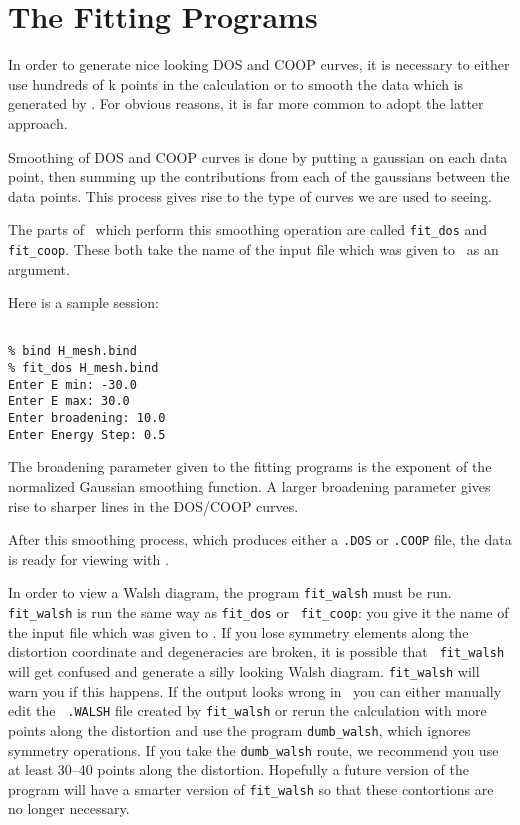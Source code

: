 \chapter{The Fitting Programs}

In order to generate nice looking DOS and COOP curves, it is necessary
to either use hundreds of k points in the calculation or to smooth the
data which is 
generated by \calcprog.  For obvious reasons, it is far more common
to adopt the latter approach.

Smoothing of DOS and COOP curves is done by putting a gaussian on each
data point, then summing up the contributions from each of the
gaussians between the data points.  This process gives rise to the
type of curves we are used to seeing.

The parts of \prog\ which perform this smoothing operation are called
{\tt fit\_dos} and {\tt fit\_coop}.  These both take the name of the
input file which was given to \calcprog\ as an argument.

Here is a sample session:

\shrinkspacing

\begin{verbatim}

% bind H_mesh.bind
% fit_dos H_mesh.bind
Enter E min: -30.0
Enter E max: 30.0
Enter broadening: 10.0
Enter Energy Step: 0.5

\end{verbatim}

\resumespacing

The broadening parameter given to the fitting programs is the exponent
of the normalized Gaussian smoothing function.  A larger broadening
parameter gives rise to sharper lines in the DOS/COOP curves.

After this smoothing process, which produces either a {\tt .DOS} or
{\tt .COOP} file, the data is ready for viewing with \viewprog.

In order to view a Walsh diagram, the program {\tt fit\_walsh} must be
run.  {\tt fit\_walsh} is run the same way as {\tt fit\_dos} or {\tt
fit\_coop}: you give it the name of the input file which was given to
\calcprog.  If you lose symmetry elements along the distortion
coordinate and degeneracies are broken, it is possible that {\tt
fit\_walsh} will get confused and generate a silly looking Walsh
diagram.  {\tt fit\_walsh} will warn you if this happens.  If the
output looks wrong in \viewprog\, you can either manually edit the {\tt 
.WALSH} file created by {\tt fit\_walsh} or rerun the calculation with
more points along the distortion and use the program {\tt dumb\_walsh},
which ignores symmetry operations.  If you take the {\tt dumb\_walsh}
route, we recommend you use at least 30--40 points along the
distortion.  Hopefully a future version of the program will have a
smarter version of {\tt fit\_walsh} so that these contortions are no
longer necessary.

